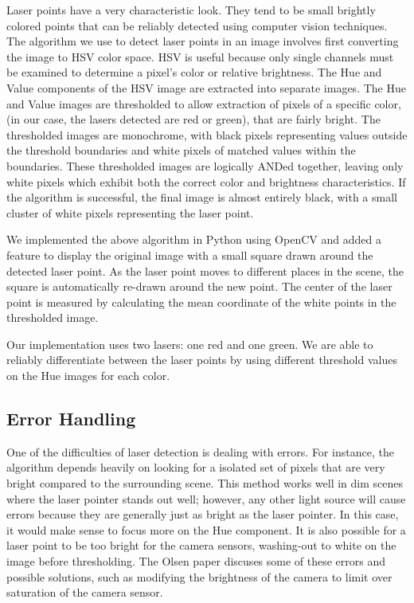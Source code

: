 \documentclass[10pt,twocolumn,letterpaper]{article}
\begin{document}
Laser points have a very characteristic look. They tend to be small brightly colored points that can be reliably detected using computer vision techniques. The algorithm we use to detect laser points in an image involves first converting the image to HSV color space. HSV is useful because only single channels must be examined to determine a pixel's color or relative brightness. The Hue and Value components of the HSV image are extracted into separate images. The Hue and Value images are thresholded to allow extraction of pixels of a specific color, (in our case, the lasers detected are red or green), that are fairly bright.  The thresholded images are monochrome, with black pixels representing values outside the threshold boundaries and white pixels of matched values within the boundaries.  These thresholded images are logically ANDed together, leaving only white pixels which exhibit both the correct color and brightness characteristics.  If the algorithm is successful, the final image is almost entirely black, with a small cluster of white pixels representing the laser point.

We implemented the above algorithm in Python using OpenCV and added a feature to display the original image with a small square drawn around the detected laser point.  As the laser point moves to different places in the scene, the square is automatically re-drawn around the new point.  The center of the laser point is measured by calculating the mean coordinate of the white points in the thresholded image.

Our implementation uses two lasers: one red and one green.  We are able to reliably differentiate between the laser points by using different threshold values on the Hue images for each color.

\subsection{Error Handling}

One of the difficulties of laser detection is dealing with errors. For instance, the algorithm depends heavily on looking for a isolated set of pixels that are very bright compared to the surrounding scene. This method works well in dim scenes where the laser pointer stands out well; however, any other light source will cause errors because they are generally just as bright as the laser pointer. In this case, it would make sense to focus more on the Hue component. It is also possible for a laser point to be too bright for the camera sensors, washing-out to white on the image before thresholding. The Olsen paper \cite{olsen01laser} discuses some of these errors and possible solutions, such as modifying the brightness of the camera to limit over saturation of the camera sensor.
\end{document}
